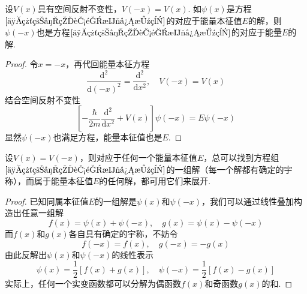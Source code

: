 \begin{theorem}\label{定理3}
    设$V(x)$具有空间反射不变性，$V(-x)=V(x)$. 如$\psi(x)$是方程$\eqref{一维粒子的能量本征方程}$的对应于能量本征值$E$的解，则$\psi(-x)$也是方程$\eqref{一维粒子的能量本征方程}$的对应于能量$E$的解.
\end{theorem}

\begin{proof}
    令$x=-x$，再代回能量本征方程
    $$
        \frac{\mathrm{d}^2}{\mathrm{d}(-x)^2}=\frac{\mathrm{d}^2}{\mathrm{d}x^2}, \quad V(-x)=V(x)
    $$
    结合空间反射不变性
    $$
        \left[-\frac{\hbar}{2m}\frac{\mathrm{d}^2}{\mathrm{d}x^2}+V(x)\right]\psi(-x)=E\psi(-x)
    $$
    显然$\psi(-x)$也满足方程，能量本征值也是$E$.
\end{proof}




\begin{theorem}\label{定理4}
    设$V(x)=V(-x)$，则对应于任何一个能量本征值$E$，总可以找到方程组$\eqref{一维粒子的能量本征方程}$的一组解（每一个解都有确定的宇称），而属于能量本征值$E$的任何解，都可用它们来展开.
\end{theorem}
\begin{proof}
    已知同属本征值$E$的一组解是$\psi(x)$和$\psi(-x)$，我们可以通过线性叠加构造出任意一组解
    $$
        f(x)=\psi(x)+\psi(-x), \quad g(x)=\psi(x)-\psi(-x)
    $$
    而$f(x)$和$g(x)$各自具有确定的宇称，不妨令
    $$
        f(-x)=f(x), \quad g(-x)=-g(x)
    $$
    由此反解出$\psi(x)$和$\psi(-x)$的线性表示
    $$
        \psi(x)=\frac{1}{2}[f(x)+g(x)], \quad \psi(-x)=\frac{1}{2}[f(x)-g(x)]
    $$
    实际上，任何一个实变函数都可以分解为偶函数$f(x)$和奇函数$g(x)$的和.
\end{proof}




